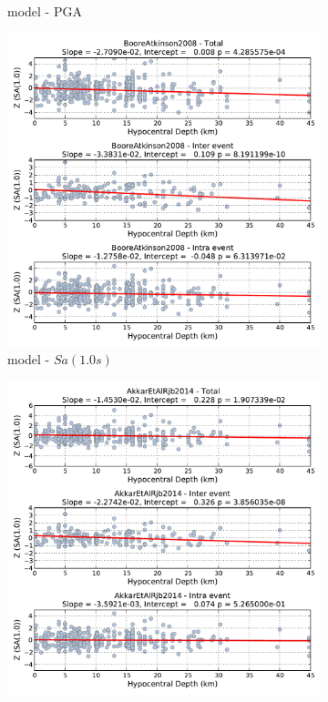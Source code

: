 \begin{figure}[htb]
\begin{subfigure}[b]{0.49\textwidth}
      \caption{\textcite{Akkar_etal2014} model - PGA}
      \label{fig:pga_depth_akkar2014}
  \end{subfigure}
    \begin{subfigure}[b]{0.49\textwidth}
      \includegraphics[width=\textwidth]{./figures/residuals/BA2008_HypoDepth_Sa1.pdf}
      \caption{\textcite{boore2008} model - $Sa \left( {1.0 s} \right)$}
      \label{fig:sa1_depth_ba2008}
  \end{subfigure}
      \begin{subfigure}[b]{0.49\textwidth}
      \includegraphics[width=\textwidth]{./figures/residuals/Akkar2014_HypoDepth_Sa1.pdf}

\end{subfigure}
\end{figure}
